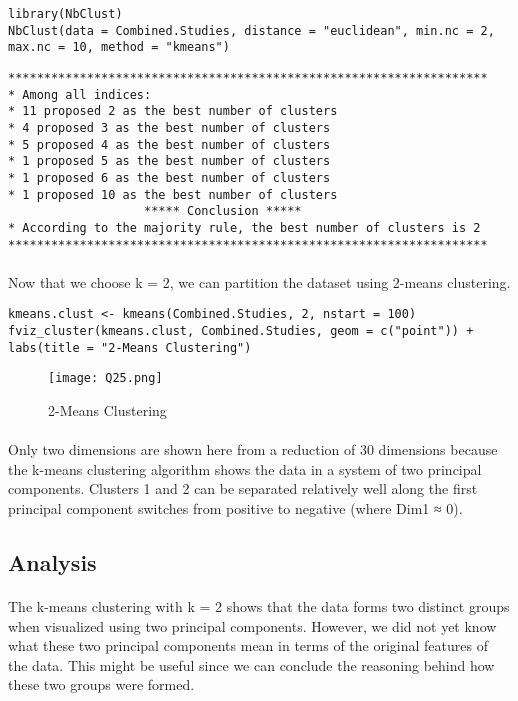 \documentclass{article}
\begin{document}
\begin{lstlisting}
library(NbClust)
NbClust(data = Combined.Studies, distance = "euclidean", min.nc = 2, max.nc = 10, method = "kmeans")
\end{lstlisting}

\begin{lstlisting}
******************************************************************* 
* Among all indices:                                                
* 11 proposed 2 as the best number of clusters 
* 4 proposed 3 as the best number of clusters 
* 5 proposed 4 as the best number of clusters 
* 1 proposed 5 as the best number of clusters 
* 1 proposed 6 as the best number of clusters 
* 1 proposed 10 as the best number of clusters 
                   ***** Conclusion *****                            
* According to the majority rule, the best number of clusters is 2
*******************************************************************
\end{lstlisting}
\paragraph{}Now that we choose k = 2, we can partition the dataset using 2-means clustering.
\begin{lstlisting}
kmeans.clust <- kmeans(Combined.Studies, 2, nstart = 100)
fviz_cluster(kmeans.clust, Combined.Studies, geom = c("point")) + labs(title = "2-Means Clustering")
\end{lstlisting}
\begin{figure}[H]
		\centering
		\texttt{[image: Q25.png]}
		\caption{2-Means Clustering}
	\end{figure}
	\paragraph{}Only two dimensions are shown here from a reduction of 30 dimensions because the k-means clustering algorithm shows the data in a system of two principal components. Clusters 1 and 2 can be separated relatively well along the first principal component switches from positive to negative (where Dim1 ≈ 0).

	\subsection{Analysis}
	\paragraph{} The k-means clustering with k = 2 shows that the data forms two distinct groups when visualized using two principal components. However, we did not yet know what these two principal components mean in terms of the original features of the data. This might be useful since we can conclude the reasoning behind how these two groups were formed.
\end{document}
